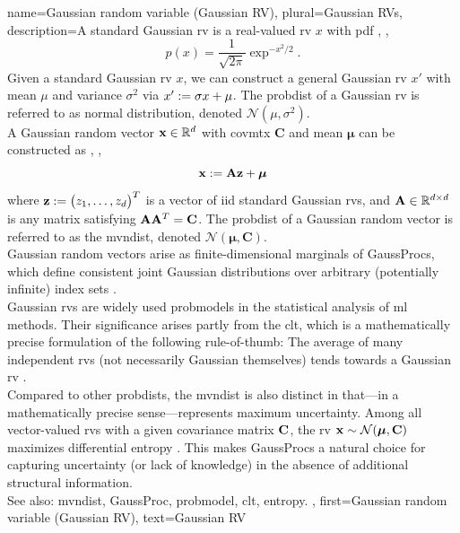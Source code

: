 {name={Gaussian random variable (Gaussian RV)}, 
	plural={Gaussian RVs}, 
	description={A  standard Gaussian \gls{rv} is a 
		real-valued \gls{rv} $x$ with \gls{pdf} \cite{BertsekasProb}, \cite{GrayProbBook}, \cite{papoulis}
		\begin{equation}
			\nonumber
			p(x) = \frac{1}{\sqrt{2\pi}} \exp^{-x^2/2}. 
		\end{equation}
		Given a standard Gaussian \gls{rv} $x$, we can construct a general Gaussian \gls{rv} $x'$ with 
		\gls{mean} $\mu$ and \gls{variance} $\sigma^2$ via $x' := \sigma x + \mu$. The \gls{probdist} of a 
		Gaussian \gls{rv} is referred to as normal distribution, denoted $\mathcal{N}(\mu, \sigma^2)$. 
		\\ 
		A Gaussian random vector ${\bf x} \in \mathbb{R}^{d}$ with 
		\gls{covmtx} $\mathbf{C}$ and \gls{mean} ${\bm \mu}$ can be constructed as \cite{GrayProbBook}, \cite{papoulis}, \cite{Lapidoth09}
		\[
		{\bf x} := \mathbf{A} {\bf z} + {\bm \mu}
		\]
		where ${\bf z} := \big( z_{1}, \ldots, z_{d} \big)^{T}$ is a vector of \gls{iid} standard Gaussian \glspl{rv}, 
		and ${\bf A} \in \mathbb{R}^{d \times d}$ is any matrix satisfying ${\bf A} {\bf A}^{T} = {\bf C}$. 
		The \gls{probdist} of a 
		Gaussian random vector is referred to as the \gls{mvndist}, denoted $\mathcal{N}({\bm \mu}, \mathbf{C})$.
		\\
		Gaussian random vectors arise as finite-dimensional marginals of \glspl{GaussProc}, which define 
		consistent joint Gaussian distributions over arbitrary (potentially infinite) index sets \cite{Rasmussen2006Gaussian}. 
  		\\
        		Gaussian \glspl{rv} are widely used \glspl{probmodel} in the statistical analysis of 
        		\gls{ml} methods. Their significance arises partly from the \gls{clt}, which is a mathematically 
        		precise formulation of the following rule-of-thumb: The average of many independent \glspl{rv} 
        		(not necessarily Gaussian themselves) tends towards a Gaussian \gls{rv} \cite{ross2013first}.
		\\ 
		Compared to other \glspl{probdist}, the \gls{mvndist} is also distinct in that—in a mathematically 
		precise sense—represents maximum \gls{uncertainty}. Among all vector-valued \glspl{rv} with 
		a given covariance matrix ${\bf C}$, the \gls{rv} ${\bf x} \sim \mathcal{N}({\bm \mu}, \mathbf{C})$ 
		maximizes differential \gls{entropy} \cite[Th. 8.6.5]{coverthomas}. This makes \glspl{GaussProc} 
		a natural choice for capturing \gls{uncertainty} (or lack of knowledge) in the absence of additional 
		structural information.
		\\ 
		See also: \gls{mvndist}, \gls{GaussProc}, \gls{probmodel}, \gls{clt}, \gls{entropy}.
	},
	first={Gaussian random variable (Gaussian RV)},
	text={Gaussian RV}
}
	
